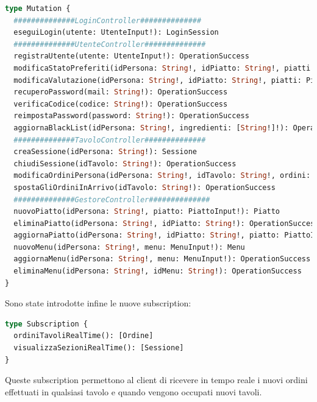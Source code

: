 \begin{lstlisting}[language=GraphQL]
type Mutation {
  ##############LoginController##############
  eseguiLogin(utente: UtenteInput!): LoginSession
  ##############UtenteController##############
  registraUtente(utente: UtenteInput!): OperationSuccess
  modificaStatoPreferiti(idPersona: String!, idPiatto: String!, piatti: [PiattoInput!]!): OperationSuccess
  modificaValutazione(idPersona: String!, idPiatto: String!, piatti: PiattoPreferito!): OperationSuccess
  recuperoPassword(mail: String!): OperationSuccess
  verificaCodice(codice: String!): OperationSuccess
  reimpostaPassword(password: String!): OperationSuccess
  aggiornaBlackList(idPersona: String!, ingredienti: [String!]!): OperationSuccess
  ##############TavoloController##############
  creaSessione(idPersona: String!): Sessione
  chiudiSessione(idTavolo: String!): OperationSuccess
  modificaOrdiniPersona(idPersona: String!, idTavolo: String!, ordini: [OrdineInput!]!): OperationSuccess
  spostaGliOrdiniInArrivo(idTavolo: String!): OperationSuccess
  ##############GestoreController##############
  nuovoPiatto(idPersona: String!, piatto: PiattoInput!): Piatto
  eliminaPiatto(idPersona: String!, idPiatto: String!): OperationSuccess
  aggiornaPiatto(idPersona: String!, idPiatto: String!, piatto: PiattoInput!): OperationSuccess
  nuovoMenu(idPersona: String!, menu: MenuInput!): Menu
  aggiornaMenu(idPersona: String!, menu: MenuInput!): OperationSuccess
  eliminaMenu(idPersona: String!, idMenu: String!): OperationSuccess
}
\end{lstlisting}
Sono state introdotte infine le nuove subscription:
\begin{lstlisting}[language=GraphQL]
type Subscription {
  ordiniTavoliRealTime(): [Ordine]
  visualizzaSezioniRealTime(): [Sessione]
}
\end{lstlisting}
Queste subscription permettono al client di ricevere in tempo reale i nuovi ordini effettuati in qualsiasi tavolo e quando vengono occupati nuovi tavoli.
